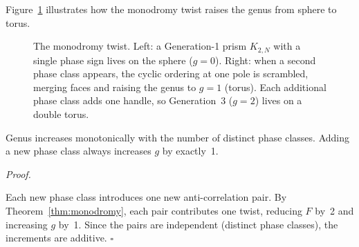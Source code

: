\documentclass[11pt, a4paper, openany]{book}
\newcounter{thm}[chapter]
\renewenvironment{proof}[1][Proof]{%
  \par\noindent\textit{#1.}\quad
}{\hfill$\square$\par\medskip}
\begin{document}
\noindent
Figure~\ref{fig:monodromy} illustrates how the monodromy twist raises
the genus from sphere to torus.

\begin{figure}[ht]
\centering
{}
\caption{The monodromy twist.  Left: a Generation-1 prism $K_{2,N}$
with a single phase sign lives on the sphere ($g = 0$).  Right: when
a second phase class appears, the cyclic ordering at one pole is
scrambled, merging faces and raising the genus to $g = 1$ (torus).
Each additional phase class adds one handle, so Generation~3 ($g = 2$)
lives on a double torus.}
\label{fig:monodromy}
\end{figure}

\begin{theorem}\label{thm:squeezing}
Genus increases monotonically with the number of distinct phase classes. Adding a new phase class always increases $g$ by exactly~1.
\end{theorem}

\begin{proof}
Each new phase class introduces one new anti-correlation pair. By Theorem~\ref{thm:monodromy}, each pair contributes one twist, reducing $F$ by~2 and increasing $g$ by~1. Since the pairs are independent (distinct phase classes), the increments are additive.
\end{proof}
\end{document}
